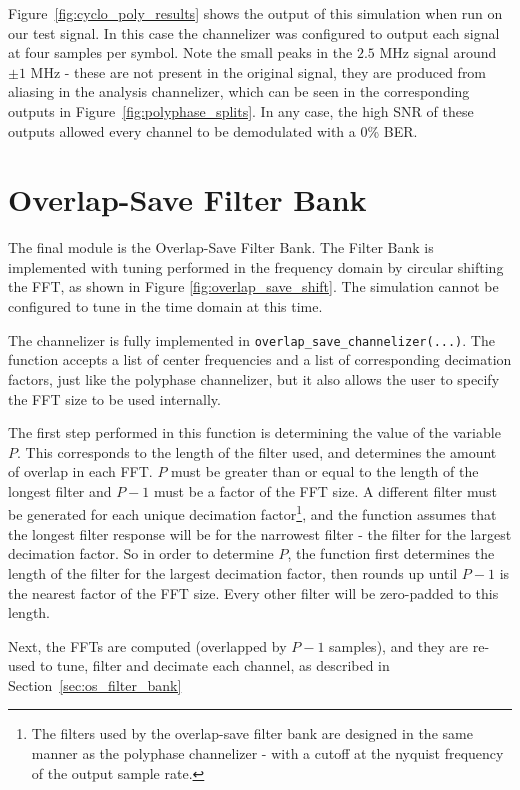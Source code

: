 \documentclass[12pt]{report}
\begin{document}
Figure~\ref{fig:cyclo_poly_results} shows the output of this simulation when
run on our test signal. In this case the channelizer was configured to output
each signal at four samples per symbol. Note the small peaks in the $2.5$ MHz
signal around $\pm1$ MHz - these are not present in the original signal, they
are produced from aliasing in the analysis channelizer, which can be seen in
the corresponding outputs in Figure~\ref{fig:polyphase_splits}. In any case, the
high SNR of these outputs allowed every channel to be demodulated with a 0\%
BER.

\section{Overlap-Save Filter Bank}
\label{sec:sim_os}
The final module is the Overlap-Save Filter Bank. The Filter Bank is
implemented with tuning performed in the frequency domain by circular shifting
the FFT, as shown in Figure \ref{fig:overlap_save_shift}. The
simulation cannot be configured to tune in the time domain at this time.

The channelizer is fully implemented in \texttt{overlap\_save\_channelizer(...)}.
The function accepts a list of center frequencies and a list of corresponding decimation factors, just like the polyphase channelizer, but it also allows the user to specify the FFT size to be used internally.

The first step performed in this function is determining the value of the
variable $P$. This corresponds to the length of the filter used, and determines
the amount of overlap in each FFT. $P$ must be greater than or equal to the
length of the longest filter and $P-1$ must be a factor of the FFT size.
A different filter must be generated for each unique decimation
factor\footnote{The filters used by the overlap-save filter bank are designed
    in the same manner as the polyphase channelizer - with a cutoff at the
nyquist frequency of the output sample rate.}, and the function assumes that
the longest filter response will be for the narrowest filter - the filter for
the largest decimation factor. So in order to determine $P$, the function first
determines the length of the filter for the largest decimation factor, then
rounds up until $P-1$ is the nearest factor of the FFT size. Every other filter
will be zero-padded to this length.

Next, the FFTs are computed (overlapped by $P-1$ samples), and they are re-used
to tune, filter and decimate each channel, as described in
Section~\ref{sec:os_filter_bank}
\end{document}
